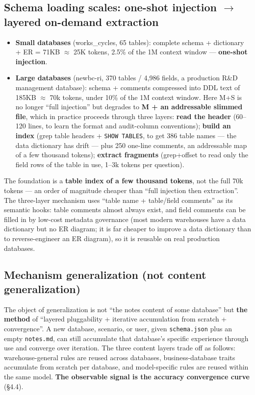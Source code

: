 \documentclass[11pt]{article}
\begin{document}
\subsection{Schema loading scales: one-shot injection $\rightarrow$ layered on-demand extraction}

\begin{itemize}
\item
  \textbf{Small databases} (works\_cycles, 65 tables): complete schema + dictionary + ER = 71KB $\approx$ 25K tokens, 2.5\% of the 1M context window --- \textbf{one-shot injection}.
\item
  \textbf{Large databases} (newbc-ri, 370 tables / 4,986 fields, a production R\&D management database): schema + comments compressed into DDL text of 185KB $\approx$ 70k tokens, under 10\% of the 1M context window. Here M+S is no longer ``full injection'' but degrades to \textbf{M + an addressable slimmed file}, which in practice proceeds through three layers: \textbf{ read the header} (60--120 lines, to learn the format and audit-column conventions); \textbf{ build an index} (grep table headers + \texttt{SHOW\ TABLES}, to get 386 table names --- the data dictionary has drift --- plus 250 one-line comments, an addressable map of a few thousand tokens); \textbf{ extract fragments} (grep+offset to read only the field rows of the table in use, 1--3k tokens per question).
\end{itemize}

The foundation is a \textbf{table index of a few thousand tokens}, not the full 70k tokens --- an order of magnitude cheaper than ``full injection then extraction''. The three-layer mechanism uses ``table name + table/field comments'' as its semantic hooks: table comments almost always exist, and field comments can be filled in by low-cost metadata governance (most modern warehouses have a data dictionary but no ER diagram; it is far cheaper to improve a data dictionary than to reverse-engineer an ER diagram), so it is reusable on real production databases.

\subsection{Mechanism generalization (not content generalization)}

The object of generalization is not ``the notes content of some database'' but \textbf{the method} of ``layered pluggability + iterative accumulation from scratch + convergence''. A new database, scenario, or user, given \texttt{schema.json} plus an empty \texttt{notes.md}, can still accumulate that database's specific experience through use and converge over iteration. The three content layers trade off as follows: warehouse-general rules are reused across databases, business-database traits accumulate from scratch per database, and model-specific rules are reused within the same model. \textbf{The observable signal is the accuracy convergence curve} (\S{}4.4).
\end{document}
